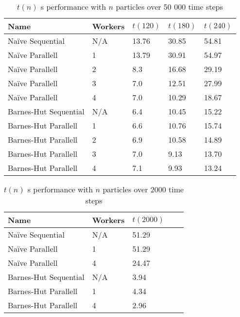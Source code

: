 \documentclass[titlepage,a4paper,12pt]{article}
\begin{document}
\begin{table}
\begin{center}
\begin{tabular}{| l | l | l | l | l |}
\hline
Name & Workers & $t(120)$ & $t(180)$ & $t(240)$\\ \hline
Na\"{i}ve Sequential & N/A & 13.76 & 30.85 & 54.81\\ \hline
Na\"{i}ve Parallell & 1 & 13.79 & 30.91 & 54.97\\ \hline
Na\"{i}ve Parallell & 2 & 8.3 & 16.68 & 29.19\\ \hline
Na\"{i}ve Parallell & 3 & 7.0 & 12.51 & 27.99\\ \hline
Na\"{i}ve Parallell & 4 & 7.0 & 10.29 & 18.67\\ \hline
Barnes-Hut Sequential & N/A & 6.4 & 10.45 & 15.22\\ \hline
Barnes-Hut Parallell & 1 & 6.6 & 10.76 & 15.74 \\ \hline
Barnes-Hut Parallell & 2 & 6.9 & 10.58 & 14.89 \\ \hline
Barnes-Hut Parallell & 3 & 7.0 & 9.13 & 13.70\\ \hline
Barnes-Hut Parallell & 4 & 7.1 & 9.93 & 13.24\\ \hline
\end{tabular}
\end{center}
\caption {$t(n)$ s performance with $n$ particles over 50 000 time steps}
\label{tab:120}
\end{table}

\begin{table}
\begin{center}
\begin{tabular}{| l | l | l | l | l |}
\hline
Name & Workers & $t(2000)$\\ \hline
Na\"{i}ve Sequential & N/A & 51.29 \\ \hline
Na\"{i}ve Parallell & 1 & 51.29 \\ \hline
Na\"{i}ve Parallell & 4 & 24.47 \\ \hline
Barnes-Hut Sequential & N/A & 3.94 \\ \hline
Barnes-Hut Parallell & 1 & 4.34  \\ \hline
Barnes-Hut Parallell & 4 & 2.96\\ \hline
\end{tabular}
\end{center}
\caption {$t(n)$ s performance with $n$ particles over 2000 time steps}
\label{tab:2000}
\end{table}
\end{document}
